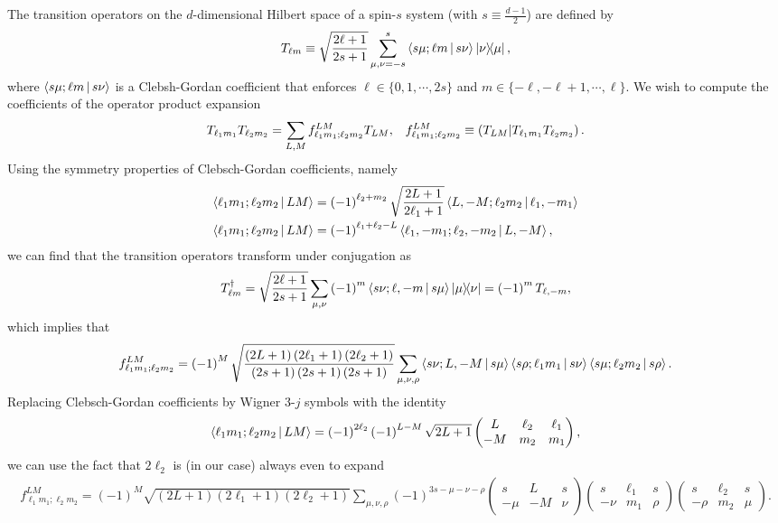 \documentclass[notitlepage,twocolumn]{revtex4-2}
\newcommand{\f}[2]{\dfrac{#1}{#2}} %
\newcommand{\p}[1]{\left(#1\right)} %
\newcommand{\bk}{\Braket} %
\renewcommand{\set}[1]{\{#1\}} %
\def\obk#1{\mathinner{({#1})}}
\begin{document}
The transition operators on the $d$-dimensional Hilbert space of a spin-$s$ system (with $s\equiv\frac{d-1}{2}$) are defined by
\begin{align}
  T_{\ell m} \equiv \sqrt{\f{2\ell+1}{2s+1}} \sum_{\mu,\nu=-s}^s
  \bk{s\mu;\ell m|s\nu} \op{\nu}{\mu},
\end{align}
where $\bk{s\mu;\ell m|s\nu}$ is a Clebsh-Gordan coefficient that enforces $\ell\in\set{0,1,\cdots,2s}$ and $m\in\set{-\ell,-\ell+1,\cdots,\ell}$.
We wish to compute the coefficients of the operator product expansion
\begin{align}
  T_{\ell_1 m_1} T_{\ell_2 m_2}
  = \sum_{L,M} f_{\ell_1 m_1;\ell_2 m_2}^{LM} T_{LM},
  &&
  f_{\ell_1 m_1;\ell_2 m_2}^{LM}
  \equiv \obk{T_{LM} | T_{\ell_1 m_1} T_{\ell_2 m_2}}.
\end{align}
Using the symmetry properties of Clebsch-Gordan coefficients, namely
\begin{align}
  \bk{\ell_1 m_1; \ell_2 m_2| L M}
  &= \p{-1}^{\ell_2+m_2} \sqrt{\f{2L+1}{2\ell_1+1}}
  \bk{L,-M; \ell_2 m_2| \ell_1,-m_1} \\
  \bk{\ell_1 m_1; \ell_2 m_2| L M}
  &= \p{-1}^{\ell_1+\ell_2-L}
  \bk{\ell_1,-m_1; \ell_2,-m_2| L,-M},
\end{align}
we can find that the transition operators transform under conjugation as
\begin{align}
  T_{\ell m}^\dag
  = \sqrt{\f{2\ell+1}{2s+1}}
  \sum_{\mu,\nu} \p{-1}^m \bk{s\nu;\ell,-m|s\mu} \op{\mu}{\nu}
  = \p{-1}^m T_{\ell,-m},
\end{align}
which implies that
\begin{align}
  f_{\ell_1 m_1;\ell_2 m_2}^{LM}
  = \p{-1}^M \sqrt{\f{\p{2L+1}\p{2\ell_1+1}\p{2\ell_2+1}}
    {\p{2s+1}\p{2s+1}\p{2s+1}}}
  \sum_{\mu,\nu,\rho} \bk{s\nu;L,-M|s\mu}
  \bk{s\rho;\ell_1m_1|s\nu} \bk{s\mu;\ell_2m_2|s\rho}.
\end{align}
Replacing Clebsch-Gordan coefficients by Wigner 3-$j$ symbols with the identity
\begin{align}
  \bk{\ell_1 m_1; \ell_2 m_2| L M}
  = \p{-1}^{2\ell_2} \p{-1}^{L-M} \sqrt{2L+1}
  \begin{pmatrix}
    L & \ell_2 & \ell_1 \\
    -M & m_2 & m_1
  \end{pmatrix},
\end{align}
we can use the fact that $2\ell_2$ is (in our case) always even to expand
\begin{align}
  f_{\ell_1 m_1;\ell_2 m_2}^{LM}
  = \p{-1}^M \sqrt{\p{2L+1}\p{2\ell_1+1}\p{2\ell_2+1}}
  \sum_{\mu,\nu,\rho} \p{-1}^{3s-\mu-\nu-\rho}
  \begin{pmatrix}
    s & L & s \\
    -\mu & -M & \nu
  \end{pmatrix}
  \begin{pmatrix}
    s & \ell_1 & s \\
    -\nu & m_1 & \rho
  \end{pmatrix}
  \begin{pmatrix}
    s & \ell_2 & s \\
    -\rho & m_2 & \mu
  \end{pmatrix}.
\end{align}
\end{document}
